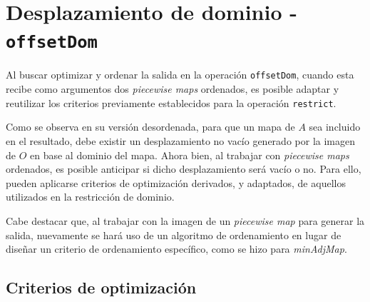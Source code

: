 \section{Desplazamiento de dominio - \texttt{offsetDom}}

Al buscar optimizar y ordenar la salida en la operación \texttt{offsetDom}, cuando esta recibe como argumentos dos \textit{piecewise maps} ordenados, es posible adaptar y reutilizar los criterios previamente establecidos para la operación \texttt{restrict}.

Como se observa en su versión desordenada, para que un mapa de $A$ sea incluido en el resultado, debe existir un desplazamiento no vacío generado por la imagen de $O$ en base al dominio del mapa. Ahora bien, al trabajar con \textit{piecewise maps} ordenados, es posible anticipar si dicho desplazamiento será vacío o no. Para ello, pueden aplicarse criterios de optimización derivados, y adaptados, de aquellos utilizados en la restricción de dominio.

Cabe destacar que, al trabajar con la imagen de un \textit{piecewise map} para generar la salida, 
nuevamente se hará uso de un algoritmo de ordenamiento en lugar de diseñar un criterio de ordenamiento específico, como se hizo para \textit{minAdjMap}.


\subsection{Criterios de optimización}


\begin{center}
\end{center}


